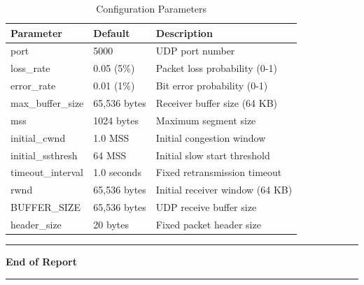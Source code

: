 \documentclass[11pt,a4paper]{article}
\begin{document}
\begin{table}[H]
\centering
\begin{tabular}{@{}lll@{}}
\toprule
\textbf{Parameter} & \textbf{Default} & \textbf{Description} \\ \midrule
port & 5000 & UDP port number \\
loss\_rate & 0.05 (5\%) & Packet loss probability (0-1) \\
error\_rate & 0.01 (1\%) & Bit error probability (0-1) \\
max\_buffer\_size & 65,536 bytes & Receiver buffer size (64 KB) \\
mss & 1024 bytes & Maximum segment size \\
initial\_cwnd & 1.0 MSS & Initial congestion window \\
initial\_ssthresh & 64 MSS & Initial slow start threshold \\
timeout\_interval & 1.0 seconds & Fixed retransmission timeout \\
rwnd & 65,536 bytes & Initial receiver window (64 KB) \\
BUFFER\_SIZE & 65,536 bytes & UDP receive buffer size \\
header\_size & 20 bytes & Fixed packet header size \\ \bottomrule
\end{tabular}
\caption{Configuration Parameters}
\end{table}

\vspace{2cm}

\begin{center}
\rule{\textwidth}{0.4pt}

\vspace{0.5cm}

\textbf{End of Report}

\rule{\textwidth}{0.4pt}
\end{center}
\end{document}
